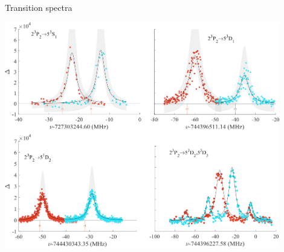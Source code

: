 \documentclass{beamer}
\begin{document}
\begin{frame}{Transition spectra}
    \begin{center}
        \includegraphics[width=0.9\textwidth]{figures/Spectra/lines_combined.png}    
    \end{center}
\end{frame}
\end{document}
